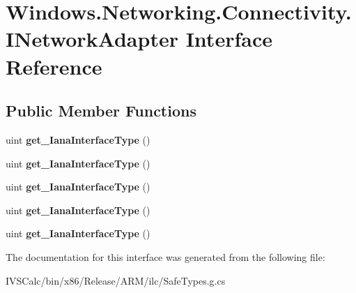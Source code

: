 \hypertarget{interface_windows_1_1_networking_1_1_connectivity_1_1_i_network_adapter}{}\section{Windows.\+Networking.\+Connectivity.\+I\+Network\+Adapter Interface Reference}
\label{interface_windows_1_1_networking_1_1_connectivity_1_1_i_network_adapter}
\subsection*{Public Member Functions}
\begin{DoxyCompactItemize}
\item 
\mbox{\label{interface_windows_1_1_networking_1_1_connectivity_1_1_i_network_adapter_a2623d965e8c844922a5c6ab3387427ab}} 
uint {\bfseries get\+\_\+\+Iana\+Interface\+Type} ()
\item 
\mbox{\label{interface_windows_1_1_networking_1_1_connectivity_1_1_i_network_adapter_a2623d965e8c844922a5c6ab3387427ab}} 
uint {\bfseries get\+\_\+\+Iana\+Interface\+Type} ()
\item 
\mbox{\label{interface_windows_1_1_networking_1_1_connectivity_1_1_i_network_adapter_a2623d965e8c844922a5c6ab3387427ab}} 
uint {\bfseries get\+\_\+\+Iana\+Interface\+Type} ()
\item 
\mbox{\label{interface_windows_1_1_networking_1_1_connectivity_1_1_i_network_adapter_a2623d965e8c844922a5c6ab3387427ab}} 
uint {\bfseries get\+\_\+\+Iana\+Interface\+Type} ()
\item 
\mbox{\label{interface_windows_1_1_networking_1_1_connectivity_1_1_i_network_adapter_a2623d965e8c844922a5c6ab3387427ab}} 
uint {\bfseries get\+\_\+\+Iana\+Interface\+Type} ()
\end{DoxyCompactItemize}


The documentation for this interface was generated from the following file\+:\begin{DoxyCompactItemize}
\item 
I\+V\+S\+Calc/bin/x86/\+Release/\+A\+R\+M/ilc/Safe\+Types.\+g.\+cs\end{DoxyCompactItemize}
